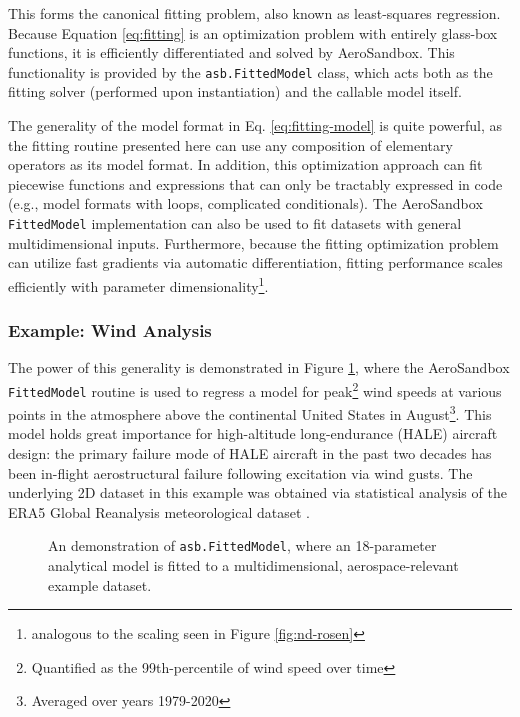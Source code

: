 This forms the canonical fitting problem, also known as least-squares regression. Because Equation \ref{eq:fitting} is an optimization problem with entirely glass-box functions, it is efficiently differentiated and solved by AeroSandbox. This functionality is provided by the \texttt{asb.FittedModel} class, which acts both as the fitting solver (performed upon instantiation) and the callable model itself.

The generality of the model format in Eq. \ref{eq:fitting-model} is quite powerful, as the fitting routine presented here can use any composition of elementary operators as its model format. In addition, this optimization approach can fit piecewise functions and expressions that can only be tractably expressed in code (e.g., model formats with loops, complicated conditionals). The AeroSandbox \texttt{FittedModel} implementation can also be used to fit datasets with general multidimensional inputs. Furthermore, because the fitting optimization problem can utilize fast gradients via automatic differentiation, fitting performance scales efficiently with parameter dimensionality\footnote{analogous to the scaling seen in Figure \ref{fig:nd-rosen}}.

\subsubsection{Example: Wind Analysis}

The power of this generality is demonstrated in Figure \ref{fig:fitting-wind}, where the AeroSandbox \texttt{FittedModel} routine is used to regress a model for peak\footnote{Quantified as the 99th-percentile of wind speed over time} wind speeds at various points in the atmosphere above the continental United States in August\footnote{Averaged over years 1979-2020}. This model holds great importance for high-altitude long-endurance (HALE) aircraft design: the primary failure mode of HALE aircraft in the past two decades has been in-flight aerostructural failure following excitation via wind gusts. The underlying 2D dataset in this example was obtained via statistical analysis of the ERA5 Global Reanalysis meteorological dataset \cite{era5}.

\begin{figure}[H]
    \centering
%    
    \ifdraft{}{}
    \caption{An demonstration of \texttt{asb.FittedModel}, where an 18-parameter analytical model is fitted to a multidimensional, aerospace-relevant example dataset.}
    \label{fig:fitting-wind}
\end{figure}

